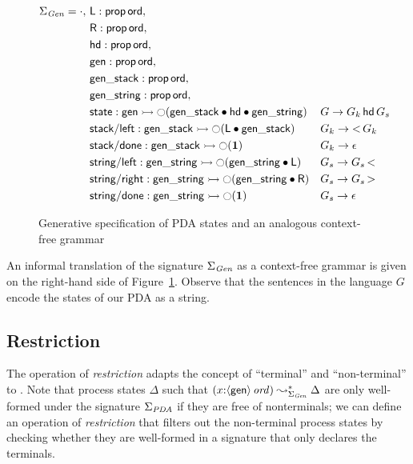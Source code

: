 \begin{figure}
\begin{align*}
 \Sigma_{\it Gen} = \cdot, 
~&{\sf L} : {\sf prop}\,{\sf ord},\\
~&{\sf R} : {\sf prop}\,{\sf ord},\\
~&{\sf hd} : {\sf prop}\,{\sf ord},\\
~&{\sf gen} : {\sf prop}\,{\sf ord},\\
~&{\sf gen\_stack} : {\sf prop}\,{\sf ord},\\
~&{\sf gen\_string} : {\sf prop}\,{\sf ord},\\
~&{\sf state} : {\sf gen} 
       \rightarrowtail {\ocircle}({\sf gen\_stack} \mathbin{\bullet} {\sf hd} 
                         \mathbin{\bullet} {\sf gen\_string})
&& G \rightarrow G_k\,{\sf hd}\,G_s\\
~&{\sf stack/left} : {\sf gen\_stack} 
       \rightarrowtail {\ocircle}({\sf L} \mathbin{\bullet} {\sf gen\_stack})
&& G_k \rightarrow {\sf <}\,G_k \\
~&{\sf stack/done} : {\sf gen\_stack} \rightarrowtail {\ocircle}(\mathbf{1})
&& G_k \rightarrow \epsilon\\
~&{\sf string/left} : 
     {\sf gen\_string} 
       \rightarrowtail {\ocircle}({\sf gen\_string} \mathbin{\bullet} {\sf L})
&& G_s \rightarrow G_s\,{\sf <}\\
~&{\sf string/right} : 
     {\sf gen\_string} 
       \rightarrowtail {\ocircle}({\sf gen\_string} \mathbin{\bullet} {\sf R})
&& G_s \rightarrow G_s\,{\sf >}\\
~&{\sf string/done} : 
     {\sf gen\_string} 
       \rightarrowtail {\ocircle}(\mathbf{1})
&& G_s \rightarrow \epsilon
\end{align*}
\caption{Generative specification of PDA states and an analogous
  context-free grammar}
\label{fig:pda-gen}
\end{figure}

An informal translation of the signature $\Sigma_{\it Gen}$ as a
context-free grammar is given on the right-hand side of
Figure~\ref{fig:pda-gen}. Observe that the sentences in the language
$G$ encode the states of our PDA as a string. 

\subsection{Restriction}

The operation of {\it restriction} adapts the concept of ``terminal''
and ``non-terminal'' to \sls. Note that process states $\Delta$
such that $(x{:}{\langle {\sf gen} \rangle}\,{{\it ord}}) \leadsto^*_{\Sigma_{\it Gen}}
\Delta$ are only well-formed under the signature $\Sigma_{\it PDA}$ if
they are free of nonterminals; we can define an operation of {\it
  restriction} that filters out the non-terminal process states by
checking whether they are well-formed in a signature that only
declares the terminals.

